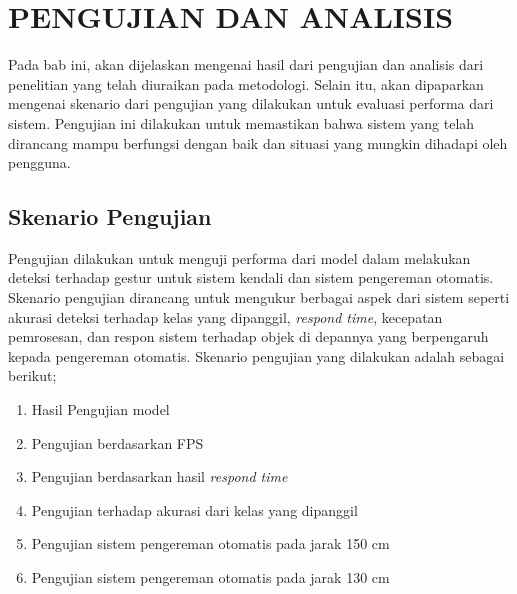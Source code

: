 \chapter{PENGUJIAN DAN ANALISIS}
Pada bab ini, akan dijelaskan mengenai hasil dari pengujian dan analisis dari penelitian yang telah diuraikan pada metodologi. Selain itu, akan dipaparkan mengenai skenario dari pengujian yang dilakukan untuk evaluasi performa dari sistem. Pengujian ini dilakukan untuk memastikan bahwa sistem yang telah dirancang mampu berfungsi dengan baik dan situasi yang mungkin dihadapi oleh pengguna.
\section{Skenario Pengujian}
Pengujian dilakukan untuk menguji performa dari model dalam melakukan deteksi terhadap gestur untuk sistem kendali dan sistem pengereman otomatis. Skenario pengujian dirancang untuk mengukur berbagai aspek dari sistem seperti akurasi deteksi terhadap kelas yang dipanggil, \emph{respond time}, kecepatan pemrosesan, dan respon sistem terhadap objek di depannya yang berpengaruh kepada pengereman otomatis. Skenario pengujian yang dilakukan adalah sebagai berikut;
\begin{enumerate}
    \item Hasil Pengujian model
    \item Pengujian berdasarkan FPS
    \item Pengujian berdasarkan hasil \emph{respond time}
    \item Pengujian terhadap akurasi dari kelas yang dipanggil
    \item Pengujian sistem pengereman otomatis pada jarak 150 cm
    \item Pengujian sistem pengereman otomatis pada jarak 130 cm
\end{enumerate}
